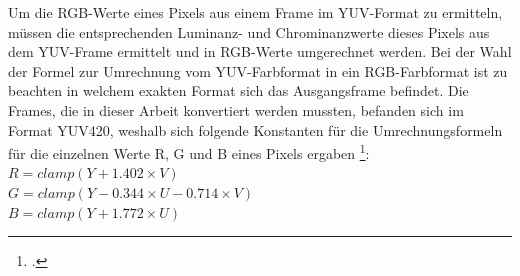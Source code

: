 Um die RGB-Werte eines Pixels aus einem Frame im YUV-Format zu ermitteln, müssen die entsprechenden Luminanz- und Chrominanzwerte dieses Pixels aus dem YUV-Frame ermittelt und in RGB-Werte umgerechnet werden. Bei der Wahl der Formel zur Umrechnung vom YUV-Farbformat in ein RGB-Farbformat ist zu beachten in welchem exakten Format sich das Ausgangsframe befindet. Die Frames, die in dieser Arbeit konvertiert werden mussten, befanden sich im Format YUV420, weshalb sich folgende Konstanten für die Umrechnungsformeln für die einzelnen Werte R, G und B eines Pixels ergaben \footcite{Konvertierung}:
\\

$R = clamp(Y + 1.402 \times V) $\\
$G = clamp(Y - 0.344 \times U - 0.714 \times V) $\\
$B = clamp(Y + 1.772 \times U) $\\